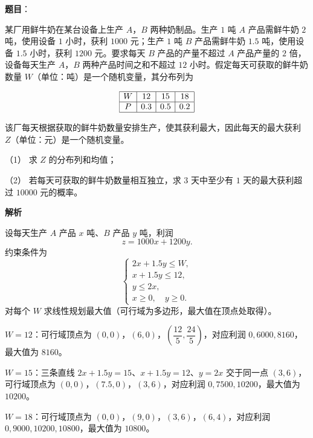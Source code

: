 \begin{answer}

\textbf{题目}：

某厂用鲜牛奶在某台设备上生产 \(A\)，\(B\) 两种奶制品。生产 \(1\) 吨 \(A\) 产品需鲜牛奶 \(2\) 吨，使用设备 \(1\) 小时，获利 \(1000\) 元；生产 \(1\) 吨 \(B\) 产品需鲜牛奶 \(1.5\) 吨，使用设备 \(1.5\) 小时，获利 \(1200\) 元。要求每天 \(B\) 产品的产量不超过 \(A\) 产品产量的 \(2\) 倍，设备每天生产 \(A\)，\(B\) 两种产品时间之和不超过 \(12\) 小时。假定每天可获取的鲜牛奶数量 \(W\)（单位：吨）是一个随机变量，其分布列为

\nopagebreak[4]
\[
\begin{array}{|c|c|c|c|}
\hline
W & 12 & 15 & 18\\
\hline
P & 0.3 & 0.5 & 0.2\\
\hline
\end{array}
\]

该厂每天根据获取的鲜牛奶数量安排生产，使其获利最大，因此每天的最大获利 \(Z\)（单位：元）是一个随机变量。

（1） 求 \(Z\) 的分布列和均值；

（2） 若每天可获取的鲜牛奶数量相互独立，求 \(3\) 天中至少有 \(1\) 天的最大获利超过 \(10000\) 元的概率。

\textbf{解析}


设每天生产 \(A\) 产品 \(x\) 吨、\(B\) 产品 \(y\) 吨，利润
\nopagebreak[4]
\[
z=1000x+1200y.
\]
约束条件为
\nopagebreak[4]
\[
\begin{cases}
2x+1.5y\leqslant W,\\
x+1.5y\leqslant12,\\
y\leqslant2x,\\
x\geqslant0,\quad y\geqslant0.
\end{cases}
\]
对每个 \(W\) 求线性规划最大值（可行域为多边形，最大值在顶点处取得）。

\textbf{\(W=12\)}：可行域顶点为 \((0,0)\)，\((6,0)\)，\(\left(\dfrac{12}{5},\dfrac{24}{5}\right)\)，对应利润 \(0,6000,8160\)，最大值为 \(8160\)。

\textbf{\(W=15\)}：三条直线 \(2x+1.5y=15\)、\(x+1.5y=12\)、\(y=2x\) 交于同一点 \((3,6)\)，可行域顶点为 \((0,0)\)，\((7.5,0)\)，\((3,6)\)，对应利润 \(0,7500,10200\)，最大值为 \(10200\)。

\textbf{\(W=18\)}：可行域顶点为 \((0,0)\)，\((9,0)\)，\((3,6)\)，\((6,4)\)，对应利润 \(0,9000,10200,10800\)，最大值为 \(10800\)。


\end{answer}
